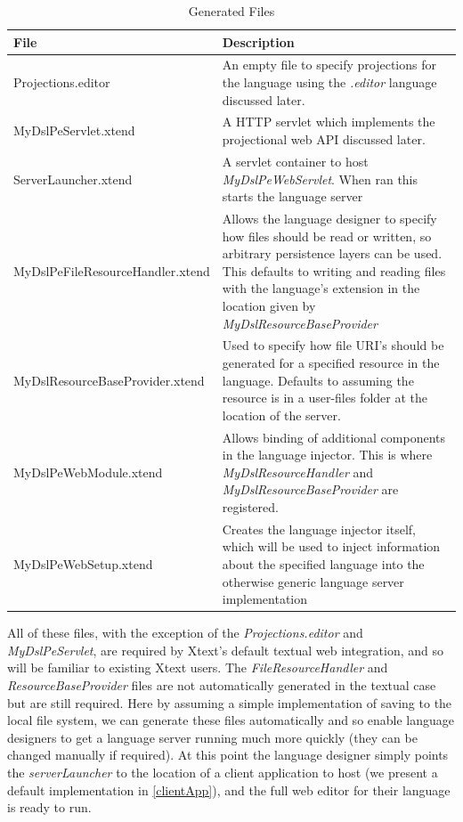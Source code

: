 \documentclass{article}
\begin{document}
\begin{table}[h!]
\centering
\begin{tabular}{| m{7cm} | m{8cm} |}
\hline
File & Description \\
\hline \hline
Projections.editor & An empty file to specify projections for the language using the \emph{.editor} language discussed later.\\
\hline
MyDslPeServlet.xtend & A HTTP servlet which implements the projectional web API discussed later.\\
\hline
ServerLauncher.xtend & A servlet container to host \emph{MyDslPeWebServlet}. When ran this starts the language server \\
\hline
MyDslPeFileResourceHandler.xtend & Allows the language designer to specify how files should be read or written, so arbitrary persistence layers can be used. This defaults to writing and reading files with the language's extension in the location given by  \emph{MyDslResourceBaseProvider} \\
\hline
MyDslResourceBaseProvider.xtend & Used to specify how file URI's should be generated for a specified resource in the language. Defaults to assuming the resource is in a user-files folder at the location of the server.\\
\hline
MyDslPeWebModule.xtend & Allows binding of additional components in the language injector. This is where \emph{MyDslResourceHandler} and \emph{MyDslResourceBaseProvider} are registered.\\
\hline
MyDslPeWebSetup.xtend & Creates the language injector itself, which will be used to inject information about the specified language into the otherwise generic language server implementation\\
\hline
\end{tabular}
\caption{Generated Files}
\label{Tab:generatedFiles}
\end{table}All of these files, with the exception of the \emph{Projections.editor} and \emph{MyDslPeServlet}, are required by Xtext's default textual web integration, and so will be familiar to existing Xtext users. The \emph{FileResourceHandler} and \emph{ResourceBaseProvider} files are not automatically generated in the textual case but are still required. Here by assuming a simple implementation of saving to the local file system, we can generate these files automatically and so enable language designers to get a language server running much more quickly (they can be changed manually if required). At this point the language designer simply points the \emph{serverLauncher} to the location of a client application to host (we present a default implementation in \ref{clientApp}), and the full web editor for their language is ready to run. 
\end{document}
